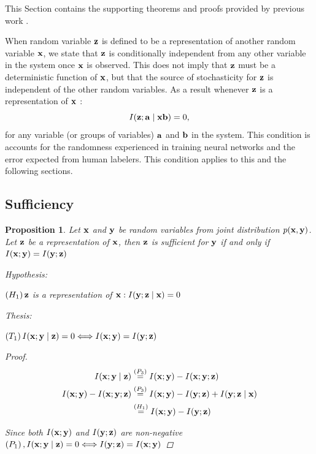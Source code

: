 \documentclass[letterpaper]{article} %
\theoremstyle{plain}
\newtheorem{proposition}[theorem]{Proposition}
\theoremstyle{definition}
\theoremstyle{remark}
\begin{document}
This Section contains the supporting theorems and proofs provided by previous work \citep{federici2020learning}.

When random variable ${\mathbf{z}}$ is defined to be a representation of another random variable ${\mathbf{x}}$, we state that ${\mathbf{z}}$ is conditionally independent from any other variable in the system once ${\mathbf{x}}$ is observed. This does not imply that ${\mathbf{z}}$ must be a deterministic function of ${\mathbf{x}}$, but that the source of stochasticity for ${\mathbf{z}}$ is independent of the other random variables. As a result whenever ${\mathbf{z}}$ is a representation of ${\mathbf{x}}$ :
$$
I({\mathbf{z}} ; {\mathbf{a}} \mid {\mathbf{x}} {\mathbf{b}})=0,
$$
for any variable (or groups of variables) ${\mathbf{a}}$ and ${\mathbf{b}}$ in the system. This condition is accounts for the randomness experienced in training neural networks and the error expected from human labelers. This condition applies to this and the following sections. 

\subsection{Sufficiency}

\begin{proposition}

Let ${\mathbf{x}}$ and ${\mathbf{y}}$ be random variables from joint distribution $p({\mathbf{x}}, {\mathbf{y}})$. Let ${\mathbf{z}}$ be a representation of ${\mathbf{x}}$, then ${\mathbf{z}}$ is sufficient for ${\mathbf{y}}$ if and only if $I({\mathbf{x}} ; {\mathbf{y}})=I({\mathbf{y}} ; {\mathbf{z}})$

Hypothesis:

$\left(H_1\right) {\mathbf{z}}$ is a representation of ${\mathbf{x}}: I({\mathbf{y}} ; {\mathbf{z}} \mid {\mathbf{x}})=0$

Thesis:

$\left(T_1\right) I({\mathbf{x}} ; {\mathbf{y}} \mid {\mathbf{z}})=0 \Longleftrightarrow I({\mathbf{x}} ; {\mathbf{y}})=I({\mathbf{y}} ; {\mathbf{z}})$

\begin{proof}
$$
\begin{aligned}
I({\mathbf{x}} ; {\mathbf{y}} \mid {\mathbf{z}}) & \stackrel{\left(P_3\right)}{=} I({\mathbf{x}} ; {\mathbf{y}})-I({\mathbf{x}} ; {\mathbf{y}} ; {\mathbf{z}}) \\
I({\mathbf{x}} ; {\mathbf{y}})-I({\mathbf{x}} ; {\mathbf{y}} ; {\mathbf{z}}) &
\stackrel{\left(P_3\right)}{=} I({\mathbf{x}} ; {\mathbf{y}})-I({\mathbf{y}} ; {\mathbf{z}})+I({\mathbf{y}} ; {\mathbf{z}} \mid {\mathbf{x}}) \\
& \stackrel{\left(H_1\right)}{=} I({\mathbf{x}} ; {\mathbf{y}})-I({\mathbf{y}} ; {\mathbf{z}})
\end{aligned}
$$

Since both $I({\mathbf{x}} ; {\mathbf{y}})$ and $I({\mathbf{y}} ; {\mathbf{z}})$ are non-negative $\left(P_1\right), I({\mathbf{x}} ; {\mathbf{y}} \mid {\mathbf{z}})=0 \Longleftrightarrow I({\mathbf{y}} ; {\mathbf{z}})=I({\mathbf{x}} ; {\mathbf{y}})$

\end{proof}
\label{sufficiency}
\end{proposition}
\end{document}
